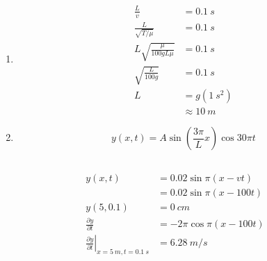 \documentclass{article}
\begin{document}
\subsection{}

\begin{enumerate}
  \item

        \begin{align*}
          \frac{L}{v}                      & = \qty{0.1}{s}      \\
          \frac{L}{\sqrt{T / \mu}}         & = \qty{0.1}{s}      \\
          L \sqrt{\frac{\mu}{100 g L \mu}} & = \qty{0.1}{s}      \\
          \sqrt{\frac{L}{100 g}}           & = \qty{0.1}{s}      \\
          L                                & = g (\qty{1}{s^2})  \\
                                           & \approx \qty{10}{m}
        \end{align*}

  \item \[y(x, t) = A \sin \left( \frac{3 \pi}{L} x \right) \cos 30 \pi t\]
\end{enumerate}

\subsection{}

\begin{align*}
  y(x, t)                                                                         & = 0.02 \sin \pi (x - v t)     \\
                                                                                  & = 0.02 \sin \pi (x - 100 t)   \\
  y(5, 0.1)                                                                       & = \qty{0}{cm}                 \\
  \frac{\partial y}{\partial t}                                                   & = -2 \pi \cos \pi (x - 100 t) \\
  \left. \frac{\partial y}{\partial t} \right|_{x = \qty{5}{m}, t = \qty{0.1}{s}} & = \qty{6.28}{m/s}
\end{align*}

\subsection{}
\end{document}
